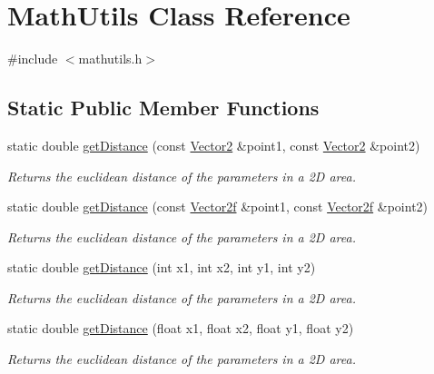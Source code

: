 \hypertarget{class_math_utils}{}\section{Math\+Utils Class Reference}
\label{class_math_utils}


{\ttfamily \#include $<$mathutils.\+h$>$}

\subsection*{Static Public Member Functions}
\begin{DoxyCompactItemize}
\item 
static double \mbox{\hyperlink{class_math_utils_a6d93f11c60b52d16fc2e86cf8e53ab32}{get\+Distance}} (const \mbox{\hyperlink{struct_vector2}{Vector2}} \&point1, const \mbox{\hyperlink{struct_vector2}{Vector2}} \&point2)
\begin{DoxyCompactList}\small\item\em Returns the euclidean distance of the parameters in a 2D area. \end{DoxyCompactList}\item 
static double \mbox{\hyperlink{class_math_utils_a7ed65746290db63515b946f9e20c0c47}{get\+Distance}} (const \mbox{\hyperlink{struct_vector2f}{Vector2f}} \&point1, const \mbox{\hyperlink{struct_vector2f}{Vector2f}} \&point2)
\begin{DoxyCompactList}\small\item\em Returns the euclidean distance of the parameters in a 2D area. \end{DoxyCompactList}\item 
static double \mbox{\hyperlink{class_math_utils_aae2742c9ac7c8d9165bddd12f6c48c54}{get\+Distance}} (int x1, int x2, int y1, int y2)
\begin{DoxyCompactList}\small\item\em Returns the euclidean distance of the parameters in a 2D area. \end{DoxyCompactList}\item 
static double \mbox{\hyperlink{class_math_utils_a890b3875fdee9b95f5e7bd6aa5242268}{get\+Distance}} (float x1, float x2, float y1, float y2)
\begin{DoxyCompactList}\small\item\em Returns the euclidean distance of the parameters in a 2D area. \end{DoxyCompactList}\end{DoxyCompactItemize}


